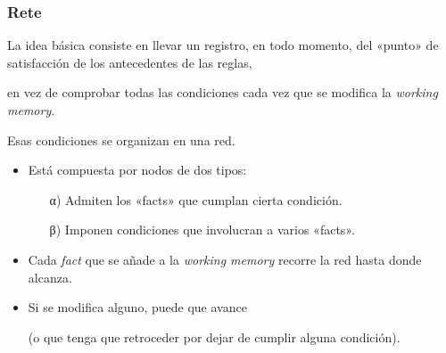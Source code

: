 \documentclass{beamer}    %
\begin{document}
\begin{frame}
 \frametitle{Rete}

 La idea básica consiste en llevar un registro, en todo
 momento, del «punto» de satisfacción de los antecedentes de
 las reglas,\\[2mm] \hfill\parbox{.85\linewidth} {en vez de
   comprobar todas las condiciones cada vez que se modifica
   la \emph{working memory}.}
 \vspace{4mm}

 \pause

 Esas condiciones se organizan en una red.
 \vspace{2mm}

 \begin{itemize}
 \item Está compuesta por nodos de dos tipos:
 \begin{itemize}
 \item[\color{naranja_muy}α)] Admiten los «facts» que cumplan cierta condición.
 \item[\color{naranja_muy}β)] Imponen condiciones que involucran a varios «facts».
 \end{itemize}
 \vspace{2mm}

 \item Cada \emph{fact} que se añade a la \emph{working
   memory} recorre la red hasta donde alcanza.
 \vspace{2mm}
 \item Si se modifica alguno, puede que avance\\[1mm]
 \hfill\parbox{.9\linewidth}{\small (o
   que tenga que retroceder por dejar de cumplir alguna
   condición).}
 \end{itemize}

\end{frame}
\end{document}

